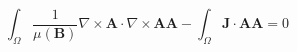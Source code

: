 \documentclass{article}
\begin{document}
$$
	  \int_{\Omega}{\frac{1}{\mu(\mathbf{B})}\nabla\times\mathbf{A}\cdot\nabla\times\mathbf{AA}}
	- \int_{\Omega}{\mathbf{J}\cdot\mathbf{AA}}
	= 0
$$
\end{document}
